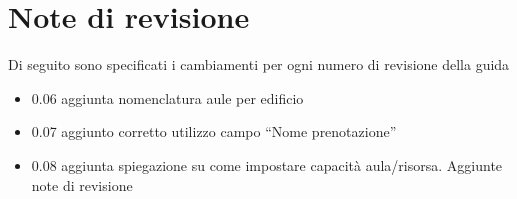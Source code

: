 \chapter{Note di revisione}
Di seguito sono specificati i cambiamenti per ogni numero di revisione
della guida
\begin{itemize}
 \item 0.06 aggiunta nomenclatura aule per edificio
 \item 0.07 aggiunto corretto utilizzo campo ``Nome prenotazione''
 \item 0.08 aggiunta spiegazione su come impostare capacità aula/risorsa. Aggiunte note di revisione
\end{itemize}
